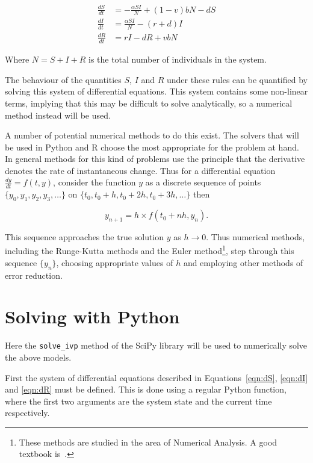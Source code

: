 \begin{align}
\frac{dS}{dt} &= -\frac{\alpha SI}{N} + (1 - v)bN - dS \label{eqn:dS}\\
\frac{dI}{dt} &= \frac{\alpha SI}{N} - (r + d)I \label{eqn:dI}\\
\frac{dR}{dt} &= rI - dR + vbN \label{eqn:dR}
\end{align}

Where $N = S + I + R$ is the total number of individuals in the system.

The behaviour of the quantities $S$, $I$ and $R$
under these rules can be quantified by solving this system of differential
equations. This system contains some non-linear terms, implying that this may be
difficult to solve analytically, so a numerical method instead will be used.

A number of potential numerical methods to do this exist.
The solvers that will be used in Python
and R choose the most appropriate for the problem at hand. In general
methods for this kind of problems use the principle that the derivative denotes
the rate of instantaneous change. Thus for a differential equation
$\frac{dy}{dt} = f(t,y)$, consider the function $y$ as a discrete sequence of
points $\{y_0, y_1, y_2, y_3, \dots\}$ on
$\{t_0, t_0 + h, t_0 + 2h, t_0 + 3h, \dots\}$ then

\begin{equation}
y_{n+1} = h \times f(t_0 + nh, y_n).
\end{equation}

This sequence approaches the true solution $y$ as $h \rightarrow 0$.
Thus numerical methods, including the Runge-Kutta methods and the Euler
method\footnote{
    These methods are studied in the area of Numerical Analysis. A good textbook
    is~\autocite{burden2001numerical}.
},
step through this sequence $\{y_n\}$, choosing appropriate values of $h$ and
employing other methods of error reduction.


\section{Solving with Python}\label{sec:system_dynamics_solving-with-python}

Here the \texttt{solve_ivp} method of the SciPy\autocite{2020SciPy-NMeth}
library will be used to numerically solve the above models.

First the system of differential equations described in Equations~\ref{eqn:dS},
\ref{eqn:dI} and \ref{eqn:dR} must be defined. This is done using a regular
Python function, where the first two arguments are the system state and the
current time respectively.

